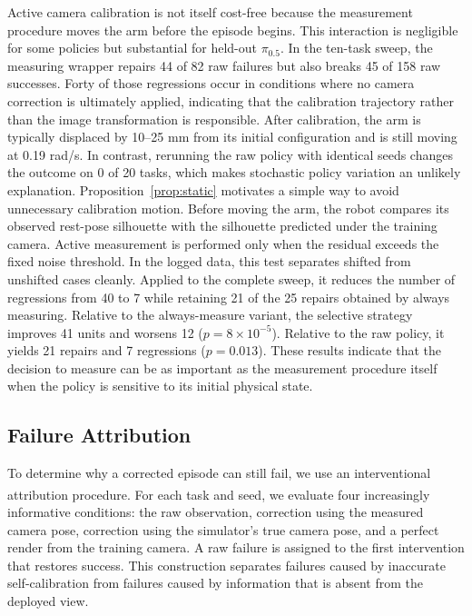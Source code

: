 \documentclass{article}
\newcommand{\ph}{\textsuperscript{\dag}}
\begin{document}
Active camera calibration is not itself cost-free because the measurement procedure moves the arm before the episode
begins. This interaction is negligible for some policies but substantial for held-out $\pi_{0.5}$. In the ten-task
sweep, the measuring wrapper repairs 44 of 82 raw failures but also breaks 45 of 158 raw successes. Forty of those
regressions occur in conditions where no camera correction is ultimately applied, indicating that the calibration
trajectory rather than the image transformation is responsible. After calibration, the arm is typically displaced by
10--25 mm from its initial configuration and is still moving at 0.19 rad/s. In contrast, rerunning the raw policy with
identical seeds changes the outcome on 0 of 20 tasks, which makes stochastic policy variation an unlikely explanation.
Proposition~\ref{prop:static} motivates a simple way to avoid unnecessary calibration motion. Before moving the arm, the
robot compares its observed rest-pose silhouette with the silhouette predicted under the training camera. Active
measurement is performed only when the residual exceeds the fixed noise threshold. In the logged data, this test
separates shifted from unshifted cases cleanly. Applied to the complete sweep, it reduces the number of regressions from
40 to 7 while retaining 21 of the 25 repairs obtained by always measuring. Relative to the always-measure variant, the
selective strategy improves 41 units and worsens 12 ($p=8\times10^{-5}$). Relative to the raw policy, it yields 21
repairs and 7 regressions ($p=0.013$). These results indicate that the decision to measure can be as important as the
measurement procedure itself when the policy is sensitive to its initial physical state.

\subsection{Failure Attribution}

\label{sec:ladder}

To determine why a corrected episode can still fail, we use an interventional attribution procedure\ph. For each task
and seed, we evaluate four increasingly informative conditions: the raw observation, correction using the measured camera
pose, correction using the simulator's true camera pose, and a perfect render from the training camera. A raw failure is
assigned to the first intervention that restores success. This construction separates failures caused by inaccurate
self-calibration from failures caused by information that is absent from the deployed view.
\end{document}
